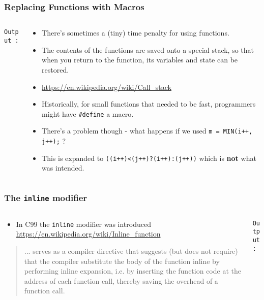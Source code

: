 \begin{frame}[fragile]
\frametitle{Replacing Functions with Macros}
\begin{columns}

\begin{column}{0.40\textwidth}

{\scriptsize{\tt Output :}}
\end{column}

\begin{column}{0.50\textwidth}
\begin{itemize}[<+->]
\item There's sometimes a (tiny) time penalty for using functions.
\item The contents of the functions are saved onto a special stack, so that when you return to the function, its variables and state can be restored.
\item \url{https://en.wikipedia.org/wiki/Call_stack}
\item Historically, for small functions that needed to be fast, programmers might have \verb^#define^ a macro.
\item There's a problem though - what happens if we used {\tt m = MIN(i++, j++);} ?
\item This is expanded to {\tt ((i++)<(j++)?(i++):(j++))} which is {\bf not} what was intended.
\end{itemize}
\end{column}

\end{columns}
\end{frame}


\begin{frame}[fragile]
\frametitle{The {\tt inline} modifier}
\begin{columns}

\begin{column}{0.50\textwidth}
\begin{itemize}[<+->]
\item In C99 the {\tt inline} modifier was introduced
\url{https://en.wikipedia.org/wiki/Inline_function}
\end{itemize}
\begin{quote}
... serves as a compiler directive that suggests (but does not
require) that the compiler substitute the body of the function inline by
performing inline expansion, i.e. by inserting the function code at the
address of each function call, thereby saving the overhead of a function
call.
\end{quote}
\end{column}

\begin{column}{0.40\textwidth}

{\scriptsize{\tt Output :}}
\end{column}

\end{columns}
\end{frame}

